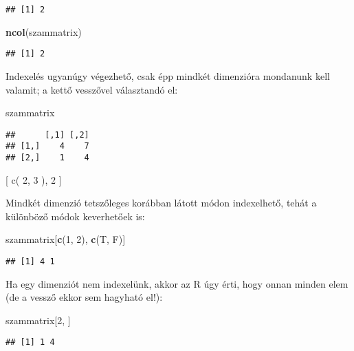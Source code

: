 \documentclass[]{book}
\newenvironment{Shaded}{\begin{snugshade}}{\end{snugshade}}
\newcommand{\KeywordTok}[1]{\textcolor[rgb]{0.13,0.29,0.53}{\textbf{#1}}}
\newcommand{\DecValTok}[1]{\textcolor[rgb]{0.00,0.00,0.81}{#1}}
\newcommand{\NormalTok}[1]{#1}
\begin{document}
\begin{verbatim}
## [1] 2
\end{verbatim}

\begin{Shaded}
\begin{Highlighting}[]
\KeywordTok{ncol}\NormalTok{(szammatrix)}
\end{Highlighting}
\end{Shaded}

\begin{verbatim}
## [1] 2
\end{verbatim}

Indexelés ugyanúgy végezhető, csak épp mindkét dimenzióra mondanunk kell
valamit; a kettő vesszővel választandó el:

\begin{Shaded}
\begin{Highlighting}[]
\NormalTok{szammatrix}
\end{Highlighting}
\end{Shaded}

\begin{verbatim}
##      [,1] [,2]
## [1,]    4    7
## [2,]    1    4
\end{verbatim}

{[} c( 2, 3 ), 2 {]}

Mindkét dimenzió tetszőleges korábban látott módon indexelhető, tehát a
különböző módok keverhetőek is:

\begin{Shaded}
\begin{Highlighting}[]
\NormalTok{szammatrix[}\KeywordTok{c}\NormalTok{(}\DecValTok{1}\NormalTok{, }\DecValTok{2}\NormalTok{), }\KeywordTok{c}\NormalTok{(T, F)]}
\end{Highlighting}
\end{Shaded}

\begin{verbatim}
## [1] 4 1
\end{verbatim}

Ha egy dimenziót nem indexelünk, akkor az R úgy érti, hogy onnan minden
elem (de a vessző ekkor sem hagyható el!):

\begin{Shaded}
\begin{Highlighting}[]
\NormalTok{szammatrix[}\DecValTok{2}\NormalTok{, ]}
\end{Highlighting}
\end{Shaded}

\begin{verbatim}
## [1] 1 4
\end{verbatim}
\end{document}
